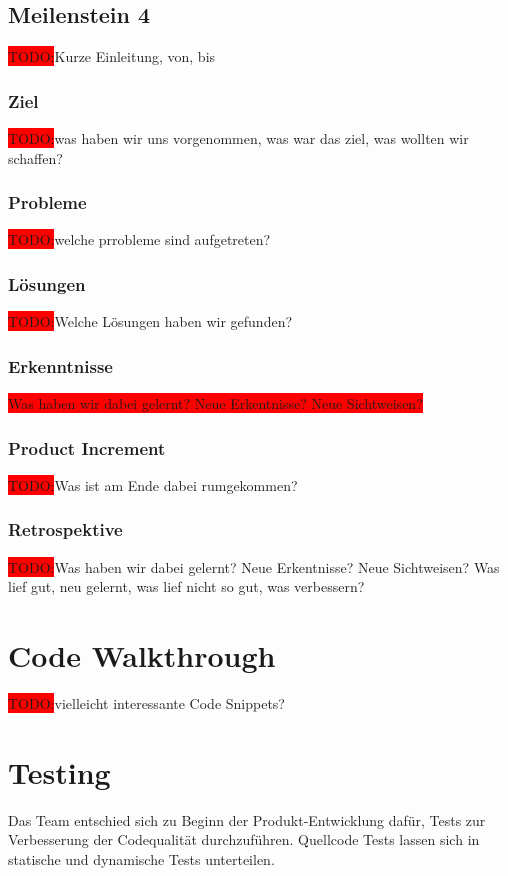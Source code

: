 \documentclass[10pt, a4paper]{article}
\begin{document}
\subsection{Meilenstein 4}
\colorbox{red}{TODO:}Kurze Einleitung, von, bis
\subsubsection{Ziel}
\colorbox{red}{TODO:}was haben wir uns vorgenommen, was war das ziel, was wollten wir schaffen?
\subsubsection{Probleme}
\colorbox{red}{TODO:}welche prrobleme sind aufgetreten?

\subsubsection{Lösungen}
\colorbox{red}{TODO:}Welche Lösungen haben wir gefunden?

\subsubsection{Erkenntnisse}
\colorbox{red}{Was haben wir dabei gelernt? Neue Erkentnisse? Neue Sichtweisen?}

\subsubsection{Product Increment}
\colorbox{red}{TODO:}Was ist am Ende dabei rumgekommen?

\subsubsection{Retrospektive}
\colorbox{red}{TODO:}Was haben wir dabei gelernt? Neue Erkentnisse? Neue Sichtweisen?
Was lief gut, neu gelernt, was lief nicht so gut, was verbessern?

\section{Code Walkthrough}
\colorbox{red}{TODO:}vielleicht interessante Code Snippets?

\section{Testing}
Das Team entschied sich zu Beginn der Produkt-Entwicklung dafür, Tests zur Verbesserung der Codequalität durchzuführen.
Quellcode Tests lassen sich in statische und dynamische Tests unterteilen.
\end{document}
